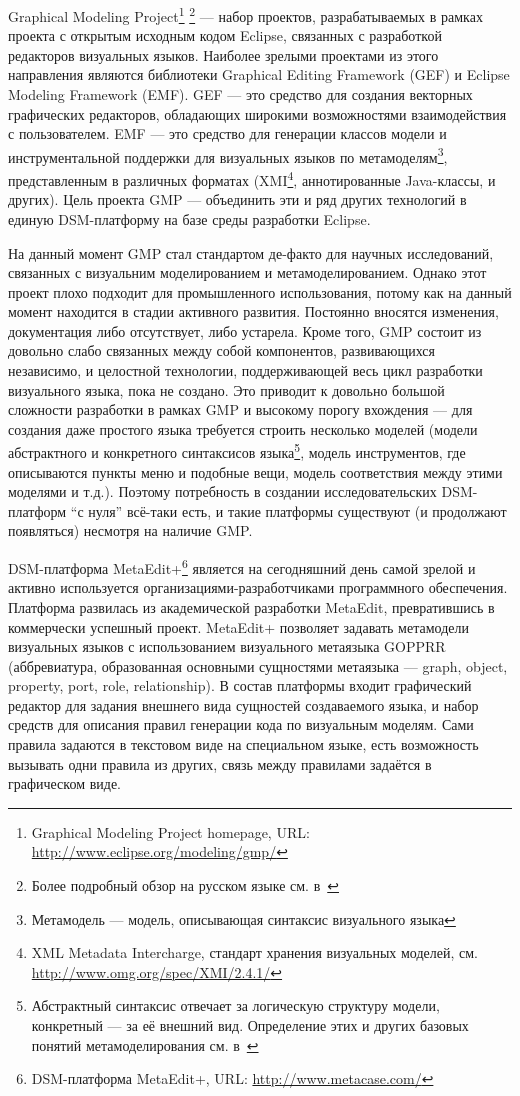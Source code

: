 \documentclass[a4]{article}
\begin{document}
Graphical Modeling Project\footnote{Graphical Modeling Project homepage, URL: \url{http://www.eclipse.org/modeling/gmp/}} \footnote{Более подробный обзор на русском языке см. в~\cite{emp}} --- набор проектов, разрабатываемых в рамках проекта с открытым исходным кодом Eclipse, связанных с разработкой редакторов визуальных языков. Наиболее зрелыми проектами из этого направления являются библиотеки Graphical Editing Framework (GEF) и Eclipse Modeling Framework (EMF). GEF --- это средство для создания векторных графических редакторов, обладающих широкими возможностями взаимодействия с пользователем. EMF --- это средство для генерации классов модели и инструментальной поддержки для визуальных языков по метамоделям\footnote{Метамодель --- модель, описывающая синтаксис визуального языка}, представленным в различных форматах (XMI\footnote{XML Metadata Intercharge, стандарт хранения визуальных моделей, см. \url{http://www.omg.org/spec/XMI/2.4.1/}}, аннотированные Java-классы, и других). Цель проекта GMP --- объединить эти и ряд других технологий в единую DSM-платформу на базе среды разработки Eclipse.

На данный момент GMP стал стандартом де-факто для научных исследований, связанных с визуальним моделированием и метамоделированием. Однако этот проект плохо подходит для промышленного использования, потому как на данный момент находится в стадии активного развития. Постоянно вносятся изменения, документация либо отсутствует, либо устарела. Кроме того, GMP состоит из довольно слабо связанных между собой компонентов, развивающихся независимо, и целостной технологии, поддерживающей весь цикл разработки визуального языка, пока не создано. Это приводит к довольно большой сложности разработки в рамках GMP и высокому порогу вхождения --- для создания даже простого языка требуется строить несколько моделей (модели абстрактного и конкретного синтаксисов языка\footnote{Абстрактный синтаксис отвечает за логическую структуру модели, конкретный --- за её внешний вид. Определение этих и других базовых понятий метамоделирования см. в~\cite{koznov}}, модель инструментов, где описываются пункты меню и подобные вещи, модель соответствия между этими моделями и т.д.). Поэтому потребность в создании исследовательских DSM-платформ “с нуля” всё-таки есть, и такие платформы существуют (и продолжают появляться) несмотря на наличие GMP.

DSM-платформа MetaEdit+\footnote{DSM-платформа MetaEdit+, URL: \url{http://www.metacase.com/}} является на сегодняшний день самой зрелой и активно используется организациями-разработчиками программного обеспечения. Платформа развилась из академической разработки MetaEdit, превратившись в коммерчески успешный проект. MetaEdit+ позволяет задавать метамодели визуальных языков с использованием визуального метаязыка GOPPRR (аббревиатура, образованная основными сущностями метаязыка --- graph, object, property, port, role, relationship). В состав платформы входит графический редактор для задания внешнего вида сущностей создаваемого языка, и набор средств для описания правил генерации кода по визуальным моделям. Сами правила задаются в текстовом виде на специальном языке, есть возможность вызывать одни правила из других, связь между правилами задаётся в графическом виде.
\end{document}
